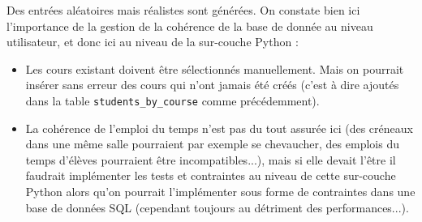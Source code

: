 \documentclass[a4paper, 11pt]{article}
\begin{document}
Des entrées aléatoires mais réalistes sont générées. On constate bien ici l'importance de la gestion de la cohérence de la base de donnée au niveau utilisateur, et donc ici au niveau de la sur-couche Python :
\begin{itemize}
\item Les cours existant doivent être sélectionnés manuellement. Mais on pourrait insérer sans erreur des cours qui n'ont jamais été créés (c'est à dire ajoutés dans la table \texttt{students\_by\_course} comme précédemment).
\item La cohérence de l'emploi du temps n'est pas du tout assurée ici (des créneaux dans une même salle pourraient par exemple se chevaucher, des emplois du temps d'élèves pourraient être incompatibles...), mais si elle devait l'être il faudrait implémenter les tests et contraintes au niveau de cette sur-couche Python alors qu'on pourrait l'implémenter sous forme de contraintes dans une base de données SQL (cependant toujours au détriment des performances...). 
\end{itemize}
\scriptsize
\end{document}
